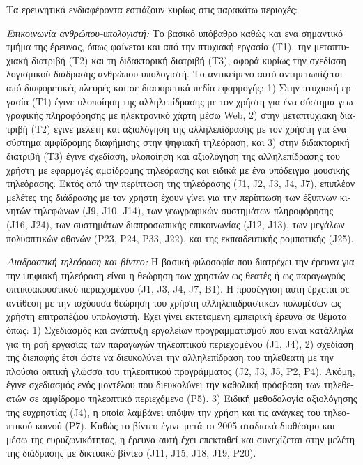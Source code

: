 \documentclass[11pt, a4paper]{article}
\begin{document}
\begin{greek}
Τα ερευνητικά ενδιαφέροντα εστιάζουν κυρίως στις παρακάτω περιοχές:

\emph{Επικοινωνία ανθρώπου-υπολογιστή:} Το βασικό υπόβαθρο καθώς και ενα
σημαντικό τμήμα της έρευνας, όπως φαίνεται και από την πτυχιακή εργασία
(Τ1), την μεταπτυχιακή διατριβή (Τ2) και τη διδακτορική διατριβή (Τ3),
αφορά κυρίως την σχεδίαση λογισμικού διάδρασης ανθρώπου-υπολογιστή. Το
αντικείμενο αυτό αντιμετωπίζεται από διαφορετικές πλευρές και σε
διαφορετικά πεδία εφαρμογής: 1) Στην πτυχιακή εργασία (Τ1) έγινε
υλοποίηση της αλληλεπίδρασης με τον χρήστη για ένα σύστημα γεωγραφικής
πληροφόρησης με ηλεκτρονικό χάρτη μέσω Web, 2) στην μεταπτυχιακή
διατριβή (Τ2) έγινε μελέτη και αξιολόγηση της αλληλεπίδρασης με τον
χρήστη για ένα σύστημα αμφίδρομης διαφήμισης στην ψηφιακή τηλεόραση, και
3) στην διδακτορική διατριβή (Τ3) έγινε σχεδίαση, υλοποίηση και
αξιολόγηση της αλληλεπίδρασης του χρήστη με εφαρμογές αμφίδρομης
τηλεόρασης και ειδικά με ένα υπόδειγμα μουσικής τηλεόρασης. Εκτός από
την περίπτωση της τηλεόρασης (J1, J2, J3, J4, J7), επιπλέον μελέτες της
διάδρασης με τον χρήστη έχουν γίνει για την περίπτωση των έξυπνων
κινητών τηλεφώνων (J9, J10, J14), των γεωγραφικών συστημάτων
πληροφόρησης (J16, J24), των συστημάτων διαπροσωπικής επικοινωνίας (J12,
J13), των μεγάλων πολυαπτικών οθονών (P23, P24, P33, J22), και της
εκπαιδευτικής ρομποτικής (J25).

\emph{Διαδραστική τηλεόραση και βίντεο:} Η βασική φιλοσοφία που
διατρέχει την έρευνα για την ψηφιακή τηλεόραση είναι η θεώρηση των
χρηστών ως θεατές ή ως παραγωγούς οπτικοακουστικού περιεχομένου (J1, J3,
J4, J7, B1). Η προσέγγιση αυτή έρχεται σε αντίθεση με την ισχύουσα
θεώρηση του χρήστη αλληλεπιδραστικών πολυμέσων ως χρήστη επιτραπέζιου
υπολογιστή. Εχει γίνει εκτεταμένη εμπειρική έρευνα σε θέματα όπως: 1)
Σχεδιασμός και ανάπτυξη εργαλείων προγραμματισμού που είναι κατάλληλα
για τη ροή εργασίας των παραγωγών τηλεοπτικού περιεχομένου (J1, J4), 2)
σχεδίαση της διεπαφής έτσι ώστε να διευκολύνει την αλληλεπίδραση του
τηλεθεατή με την πλούσια οπτική γλώσσα του τηλεοπτικού προγράμματος (J2,
J3, J5, P2, P4). Ακόμη, έγινε σχεδιασμός ενός μοντέλου που διευκολύνει
την καθολική πρόσβαση των τηλεθεατών σε αμφίδρομο τηλεοπτικό περιεχόμενο
(P5). 3) Ειδική μεθοδολογία αξιολόγησης της ευχρηστίας (J4), η οποία
λαμβάνει υπόψιν την χρήση και τις ανάγκες του τηλεοπτικού κοινού (P7).
Καθώς το βίντεο έγινε μετά το 2005 σταδιακά διαθέσιμο και μέσω της
ευρυζωνικότητας, η έρευνα αυτή έχει επεκταθεί και συνεχίζεται στην
μελέτη της διάδρασης με δικτυακό βίντεο (J11, J15, J18, J19, P20).


\end{greek}
\end{document}
